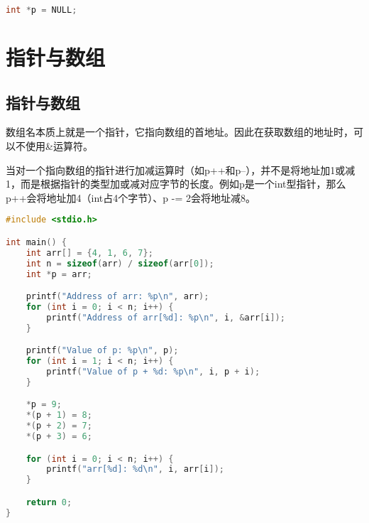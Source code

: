 \vspace{-0.5cm}

\begin{lstlisting}[language=C]
int *p = NULL;
\end{lstlisting}

\newpage

\section{指针与数组}

\subsection{指针与数组}

数组名本质上就是一个指针，它指向数组的首地址。因此在获取数组的地址时，可以不使用\&运算符。\\

\begin{figure}[H]
    \centering
\end{figure}

当对一个指向数组的指针进行加减运算时（如p++和p--），并不是将地址加1或减1，而是根据指针的类型加或减对应字节的长度。例如p是一个int型指针，那么p++会将地址加4（int占4个字节）、p -= 2会将地址减8。\\


\begin{lstlisting}[language=C]
#include <stdio.h>

int main() {
    int arr[] = {4, 1, 6, 7};
    int n = sizeof(arr) / sizeof(arr[0]);
    int *p = arr;

    printf("Address of arr: %p\n", arr);
    for (int i = 0; i < n; i++) {
        printf("Address of arr[%d]: %p\n", i, &arr[i]);
    }

    printf("Value of p: %p\n", p);
    for (int i = 1; i < n; i++) {
        printf("Value of p + %d: %p\n", i, p + i);
    }

    *p = 9;
    *(p + 1) = 8;
    *(p + 2) = 7;
    *(p + 3) = 6;

    for (int i = 0; i < n; i++) {
        printf("arr[%d]: %d\n", i, arr[i]);
    }

    return 0;
}
\end{lstlisting}

